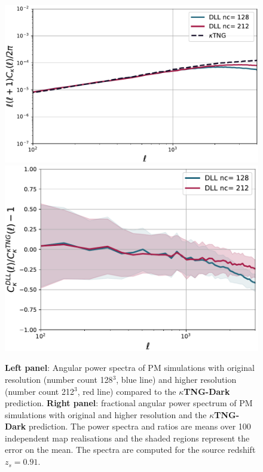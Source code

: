 \documentclass{aa}
\begin{document}
\begin{appendix}
\renewcommand{\thefigure}{C\arabic{figure}}
\setcounter{figure}{0}
\begin{figure}
    \centering
    \includegraphics[width=\columnwidth]{paper/figures/cls_DLL_vs_ktng_high.pdf}
        \includegraphics[width=0.90\columnwidth]{paper/figures/res_cls_DLL_vs_ktng_high.pdf}
    \caption{
    \textbf{Left panel}: Angular power spectra of PM simulations with original resolution (number count 128$^3$, blue line) and higher resolution (number count 212$^3$, red line) compared to the \textbf{$\kappa$TNG-Dark} prediction. \textbf{Right panel}: fractional angular power spectrum of PM simulations with original and higher resolution and the \textbf{$\kappa$TNG-Dark} prediction. The power spectra and ratios are means over 100 independent map realisations and the shaded regions represent the error on the mean. The spectra are computed for the source redshift $z_s=0.91$. 
}
    \label{fig:ps_comp_high}
\end{figure}


\end{appendix}
\end{document}
